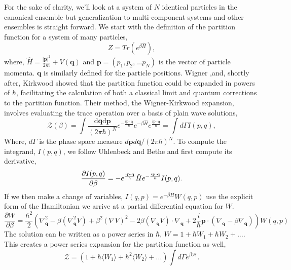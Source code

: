 For the sake of clarity, we'll look at a system of $N$ identical particles in the canonical ensemble but generalization to multi-component systems and other ensembles is straight forward. 
We start with the definition of the partition function for a system of many particles,  
\begin{equation}
    Z = Tr(e^{\beta \hat{H}}),
\end{equation} 
where, $\hat{H} = \frac{\vert\mathbf{p}\vert^2}{2m} + V(\mathbf{q})$ and $\mathbf{p} = (p_1, p_2, ...p_N)$ is the vector of particle momenta. 
$\mathbf{q}$ is similarly defined for the particle positions.
Wigner \cite{PhysRev.40.749},and, shortly after, Kirkwood \cite{PhysRev.44.31} showed that the partition function could be expanded in powers of $\hbar$, facilitating the calculation of both a classical limit and quantum corrections to the partition function.
Their method, the Wigner-Kirkwood expansion, involves evaluating the trace operation over a basis of plain wave solutions,
\begin{equation}
	\mathcal{Z}(\beta) = \int 
		\frac{\mathrm{d}\mathbf{q} \mathrm{d}\mathbf{p}}{(2\pi \hbar)^N}
		e^{-\frac{i\mathbf{p}\cdot\mathbf{q}}{\hbar}}
		e^{-\beta \hat{H}}
		e^{\frac{i\mathbf{p}\cdot\mathbf{q}}{\hbar}} = \int d\Gamma I(p, q),
\end{equation}
Where, $d\Gamma$ is the phase space measure $d\mathbf{p}d\mathbf{q}/(2\pi\hbar)^N$.
To compute the integrand, $I(p, q)$, we follow Uhlenbeck and Bethe \cite{Uhlenbeck1936729} and first compute its derivative,
\begin{equation}
	\frac{\partial I(p, q)}{\partial \beta} = -e^{\frac{i\mathbf{p}\cdot\mathbf{q}}{\hbar}}\hat{H}e^{-\frac{i\mathbf{p}\cdot\mathbf{q}}{\hbar}} I(p, q).
\end{equation}
If we then make a change of variables, $I(q, p) = e^{-\beta H}W(q, p)$ use the explicit form of the Hamiltonian we arrive at a partial differential equation for $W$.
\begin{equation}
	\frac{\partial W}{\partial \beta} = \frac{\hbar^2}{2} \left(
		\nabla_{\mathbf{q}}^2 - 
		\beta(\nabla_{\mathbf{q}}^2V) + 
		\beta^2(\nabla V)^2 -
		2\beta(\nabla_{\mathbf{q}} V)\cdot\nabla_{\mathbf{q}} + 
		2 \frac{i}{\hbar}\mathbf{p}\cdot(\nabla_{\mathbf{q}} - \beta\nabla_{\mathbf{q}})
	\right)W(q, p)
\end{equation}
The solution can be written as a power series in $\hbar$, $W = 1 + \hbar W_1 + \hbar W_2 + ...$.
This creates a power series expansion for the partition function as well,
\begin{equation}
    \mathcal{Z} = (1 + \hbar \langle W_1 \rangle + \hbar^2 \langle W_2\rangle + ...) 
    \int d\Gamma e^{\beta\mathcal{H}}.
\end{equation}
